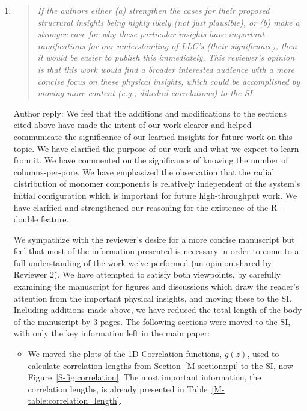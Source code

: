 \documentclass{article}
\begin{document}
\begin{enumerate}

	\item \begin{quote}
    \textit{If the authors either (a) strengthen the cases for their proposed structural
    insights being  highly likely (not just plausible), or (b) make a stronger case for
    why these particular insights have important ramifications for our understanding of 
    LLC's (their significance), then it would be easier to publish this immediately. This
    reviewer's opinion is that this work would find a broader interested audience with a more
    concise focus on these physical insights, which could be accomplished by moving more
    content (e.g., dihedral correlations) to the SI.}
    \end{quote}
    
    Author reply: We feel that the additions and modifications to the sections cited above 
    have made the intent of our work clearer and helped communicate the significance of 
    our learned insights for future work on this topic. We have clarified the purpose of our work
    and what we expect to learn from it. We have commented on the significance of knowing the
    number of columns-per-pore. We have emphasized the observation that the radial distribution
    of monomer components is relatively independent of the system's initial configuration
    which is important for future high-throughput work. We have clarified and strengthened our
    reasoning for the existence of the R-double feature.
    
    We sympathize with the reviewer's desire for a more concise manuscript but feel that most 
    of the information presented is necessary in order to come to a full understanding of the 
    work we've performed (an opinion shared by Reviewer 2). We have attempted to satisfy both
    viewpoints, by carefully examining the manuscript for figures and discussions which draw
    the reader's attention from the important physical insights, and moving these to the SI. 
    Including additions made above, we have reduced the total length of the body of the 
    manuscript by 3 pages. The following sections were moved to the SI, with only the key
    information left in the main paper:
    \begin{itemize}
    
    \item We moved the plots of the 1D Correlation functions, $g(z)$, used to calculate 
    correlation lengths from Section~\ref{M-section:rpi} to the SI, now Figure~\ref{S-fig:correlation}.
    The most important information, the correlation lengths, is already presented in 
    Table~\ref{M-table:correlation_length}.
    

\end{itemize}
\end{enumerate}
\end{document}
